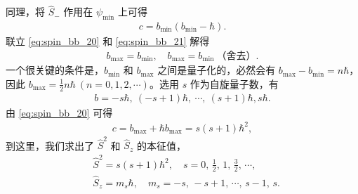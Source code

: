同理，将 $\hat S_-$ 作用在 $\psi_\text{min}$ 上可得
\begin{align}
    c = b_\text{min} (b_\text{min} - \hbar). 
    \label{eq:spin_bb_21}
\end{align}
联立 \eqref{eq:spin_bb_20} 和 \eqref{eq:spin_bb_21} 解得
\begin{align}
    b_\text{max} = b_\text{min}, \quad b_\text{max} = b_\text{min} \ \text{（舍去）}. 
\end{align}
一个很关键的条件是，$b_\text{min}$ 和 $b_\text{max}$ 之间是量子化的，必然会有 $b_\text{max} - b_\text{min} = n\hbar$，因此 $b_\text{max} = \frac12 n\hbar \ (n=0,1,2,\cdots)$。选用 $s$ 作为自旋量子数，有
\begin{align}
    b = -s\hbar,\ (-s+1)\hbar, \ \cdots, \ (s+1)\hbar, s\hbar. 
\end{align}
由 \eqref{eq:spin_bb_20} 可得
\begin{align}
    c = b_\text{max} + \hbar b_\text{max} = s(s+1) \hbar^2, 
\end{align}
到这里，我们求出了 $\hat S^2$ 和 $\hat S_z$ 的本征值，
\begin{align}
&\hat S^2  = s(s+1)\hbar^2 , \quad s = 0,\, \frac12,\, 1,\, \frac32,\, \cdots, \\
&\hat S_z  = m_s \hbar , \quad m_s = -s,\, -s+1,\, \cdots,\, s-1,\, s. 
\end{align}


